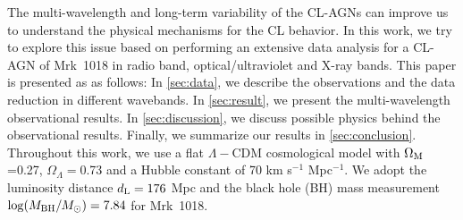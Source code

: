 The multi-wavelength and long-term variability of the CL-AGNs can improve us to understand the physical mechanisms for the CL behavior. In this work, we try to explore this issue based on performing an extensive data analysis for a CL-AGN of Mrk~1018 in radio band, optical/ultraviolet and X-ray bands. This paper is presented as as follows: In \autoref{sec:data}, we describe the observations and the data reduction in different wavebands. In \autoref{sec:result}, we present the multi-wavelength observational results. In \autoref{sec:discussion}, we discuss possible physics behind the observational results. Finally, we summarize our results in \autoref{sec:conclusion}. Throughout this work, we use a flat $\Lambda-$CDM cosmological model with $\Omega_{\rm{M}}$=0.27, $\Omega_\Lambda=$0.73 and a Hubble constant of 70 km s$^{-1}$ Mpc$^{-1}$. We adopt the luminosity distance $d_{\rm{L}}=176 $ Mpc and the black hole (BH) mass measurement $\log(M_{\rm{BH}}/M_{\odot})=7.84$ \citep{2017MNRAS.472.3492E,2018MNRAS.480.3898N} for Mrk~1018. 










